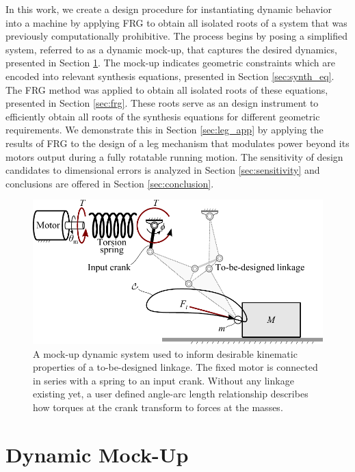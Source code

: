 \documentclass[journal]{IEEEtran}
\begin{document}
In this work, we create a design procedure for instantiating dynamic behavior into a machine by applying FRG to obtain all isolated roots of a system that was previously computationally prohibitive.
The process begins by posing a simplified system, referred to as a dynamic mock-up, that captures the desired dynamics, presented in Section \ref{sec:dynamic_mock-up}.
The mock-up indicates geometric constraints which are encoded into relevant synthesis equations, presented in Section \ref{sec:synth_eq}.
The FRG method was applied to obtain all isolated roots of these equations, presented in Section \ref{sec:frg}.
These roots serve as an design instrument to efficiently obtain all roots of the synthesis equations for different geometric requirements.
We demonstrate this in Section \ref{sec:leg_app} by applying the results of FRG to the design of a leg mechanism that modulates power beyond its motors output during a fully rotatable running motion.
The sensitivity of design candidates to dimensional errors is analyzed in Section \ref{sec:sensitivity} and conclusions are offered in Section \ref{sec:conclusion}.






\begin{figure}[b]
\centering
\includegraphics[width=1\linewidth]{dynamic_model}
\caption{A mock-up dynamic system used to inform desirable kinematic properties of a to-be-designed linkage.  The fixed motor is connected in series with a spring to an input crank.  Without any linkage existing yet, a user defined angle-arc length relationship describes how torques at the crank transform to forces at the masses.}
\label{dynamic_model}
\end{figure}


\section{Dynamic Mock-Up}
\label{sec:dynamic_mock-up}
\end{document}
